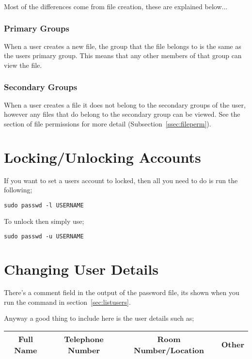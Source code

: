 Most of the differences come from file creation, these are explained below...

\subsubsection{Primary Groups}

When a user creates a new file, the group that the file belongs to is the same as the users primary group.  This means that any other members of that group can view the file.

\subsubsection{Secondary Groups}

When a user creates a file it does not belong to the secondary groups of the user, however any files that do belong to the secondary group can be viewed.  See the section of file permissions for more detail (Subsection~\ref{ssec:fileperm}).

\section{Locking/Unlocking Accounts}
\label{sec:lckpass}

If you want to set a users account to locked, then all you need to do is run the following;

\begin{lstlisting}
sudo passwd -l USERNAME
\end{lstlisting}

To unlock then simply use;

\begin{lstlisting}
sudo passwd -u USERNAME
\end{lstlisting}

\section{Changing User Details}

There's a comment field in the output of the password file, its shown when you run the command in section~\ref{sec:listusers}.

Anyway a good thing to include here is the user details such as;

\begin{table}[!th]
\centering
\begin{tabular}{|c|c|c|c|}
\hline
Full Name & Telephone Number & Room Number/Location & Other\\
\hline
\end{tabular}
\end{table}

